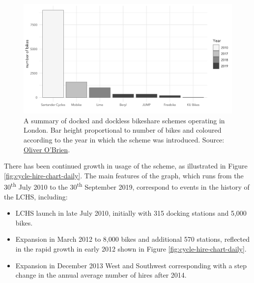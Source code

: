\documentclass[
]{article}
\providecommand{\tightlist}{%
  \setlength{\itemsep}{0pt}\setlength{\parskip}{0pt}}
\begin{document}
\begin{figure}

{\centering \includegraphics[width=0.7\linewidth]{figures/london-bike-hire-players} 

}

\caption{A summary of docked and dockless bikeshare schemes operating in London. Bar height proportional to number of bikes and coloured according to the year in which the scheme was introduced. Source: \href{https://oobrien.com/2019/07/then-there-were-eight/}{Oliver O'Brien}.}\label{fig:cycle-hire-players}
\end{figure}

There has been continued growth in usage of the scheme, as illustrated in Figure \ref{fig:cycle-hire-chart-daily}.
The main features of the graph, which runs from the 30\textsuperscript{th} July 2010 to the 30\textsuperscript{th} September 2019, correspond to events in the history of the LCHS, including:

\begin{itemize}
\tightlist
\item
  LCHS launch in late July 2010, initially with 315 docking stations and 5,000 bikes.
\item
  Expansion in March 2012 to 8,000 bikes and additional 570 stations, reflected in the rapid growth in early 2012 shown in Figure \ref{fig:cycle-hire-chart-daily}.
\item
  Expansion in December 2013 West and Southwest
  corresponding with a step change in the annual average number of hires after 2014.
\end{itemize}
\end{document}
